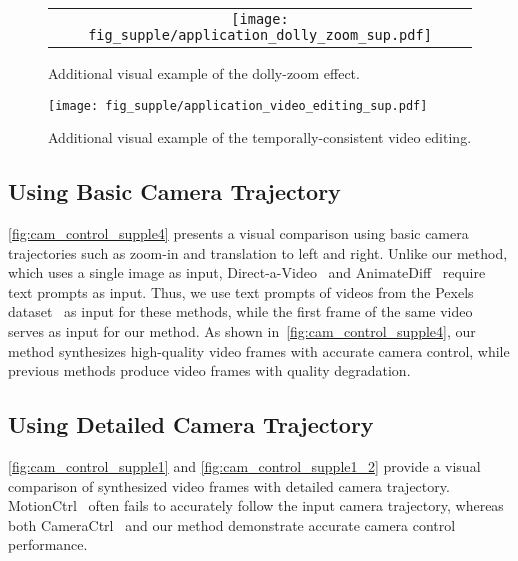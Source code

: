 \begin{figure*}[!t]
\centering
\begin{tabular}{@{}c}
\texttt{[image: fig\_supple/application\_dolly\_zoom\_sup.pdf]} \\
\end{tabular}
\vspace{-3.5mm}
\caption{
Additional visual example of the dolly-zoom effect.
}
\vspace{-2mm}
\label{fig:dolly_zoom_sup}
\end{figure*}


\begin{figure}[!t]
\centering
\texttt{[image: fig\_supple/application\_video\_editing\_sup.pdf]} \\
\vspace{-2.5mm}
\caption{
Additional visual example of the temporally-consistent video editing.
}
\vspace{-2mm}
\label{fig:video_editing_sup}
\end{figure}

\subsection{Using Basic Camera Trajectory}
\cref{fig:cam_control_supple4} presents a visual comparison using basic camera trajectories such as zoom-in and translation to left and right.
Unlike our method, which uses a single image as input, Direct-a-Video~\cite{yang2024direct} and AnimateDiff~\cite{guo2023animatediff} require text prompts as input.
Thus, we use text prompts of videos from the Pexels dataset~\cite{pexels_dataset} as input for these methods, while the first frame of the same video serves as input for our method.
As shown in~\cref{fig:cam_control_supple4}, our method synthesizes high-quality video frames with accurate camera control, while previous methods produce video frames with quality degradation.



\subsection{Using Detailed Camera Trajectory}
\cref{fig:cam_control_supple1} and \cref{fig:cam_control_supple1_2} provide a visual comparison of synthesized video frames with detailed camera trajectory.
MotionCtrl~\cite{wang2024motionctrl} often fails to accurately follow the input camera trajectory, whereas both CameraCtrl~\cite{he2024cameractrl} and our method demonstrate accurate camera control performance.

